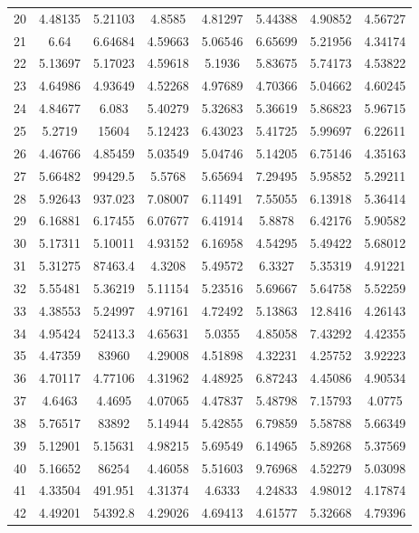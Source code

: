 \begin{center}
\begin{longtable}{cccccccc}
20 & 4.48135 & 5.21103 & 4.8585 & 4.81297 & 5.44388 & 4.90852 & 4.56727\\
21 & 6.64 & 6.64684 & 4.59663 & 5.06546 & 6.65699 & 5.21956 & 4.34174\\
22 & 5.13697 & 5.17023 & 4.59618 & 5.1936 & 5.83675 & 5.74173 & 4.53822\\
23 & 4.64986 & 4.93649 & 4.52268 & 4.97689 & 4.70366 & 5.04662 & 4.60245\\
24 & 4.84677 & 6.083 & 5.40279 & 5.32683 & 5.36619 & 5.86823 & 5.96715\\
25 & 5.2719 & 15604 & 5.12423 & 6.43023 & 5.41725 & 5.99697 & 6.22611\\
26 & 4.46766 & 4.85459 & 5.03549 & 5.04746 & 5.14205 & 6.75146 & 4.35163\\
27 & 5.66482 & 99429.5 & 5.5768 & 5.65694 & 7.29495 & 5.95852 & 5.29211\\
28 & 5.92643 & 937.023 & 7.08007 & 6.11491 & 7.55055 & 6.13918 & 5.36414\\
29 & 6.16881 & 6.17455 & 6.07677 & 6.41914 & 5.8878 & 6.42176 & 5.90582\\
30 & 5.17311 & 5.10011 & 4.93152 & 6.16958 & 4.54295 & 5.49422 & 5.68012\\
31 & 5.31275 & 87463.4 & 4.3208 & 5.49572 & 6.3327 & 5.35319 & 4.91221\\
32 & 5.55481 & 5.36219 & 5.11154 & 5.23516 & 5.69667 & 5.64758 & 5.52259\\
33 & 4.38553 & 5.24997 & 4.97161 & 4.72492 & 5.13863 & 12.8416 & 4.26143\\
34 & 4.95424 & 52413.3 & 4.65631 & 5.0355 & 4.85058 & 7.43292 & 4.42355\\
35 & 4.47359 & 83960 & 4.29008 & 4.51898 & 4.32231 & 4.25752 & 3.92223\\
36 & 4.70117 & 4.77106 & 4.31962 & 4.48925 & 6.87243 & 4.45086 & 4.90534\\
37 & 4.6463 & 4.4695 & 4.07065 & 4.47837 & 5.48798 & 7.15793 & 4.0775\\
38 & 5.76517 & 83892 & 5.14944 & 5.42855 & 6.79859 & 5.58788 & 5.66349\\
39 & 5.12901 & 5.15631 & 4.98215 & 5.69549 & 6.14965 & 5.89268 & 5.37569\\
40 & 5.16652 & 86254 & 4.46058 & 5.51603 & 9.76968 & 4.52279 & 5.03098\\
41 & 4.33504 & 491.951 & 4.31374 & 4.6333 & 4.24833 & 4.98012 & 4.17874\\
42 & 4.49201 & 54392.8 & 4.29026 & 4.69413 & 4.61577 & 5.32668 & 4.79396\\

\end{longtable}
\end{center}
